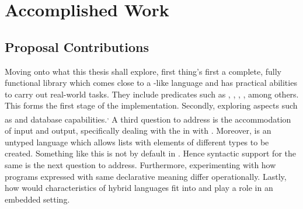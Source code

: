 \documentclass[thesis-solanki.tex]{subfiles}
\begin{document}
\chapter{Accomplished Work}\label{chap:accomplishedWork}

\section{Proposal Contributions}

Moving onto what this thesis shall explore, first thing's first a complete, fully functional library which comes
close to a -like language and has practical abilities to carry out real-world
tasks.
They include predicates such as 
, , , ,  among others.
This forms
the first stage of the implementation.
Secondly, exploring aspects such as  and database capabilities.\textsuperscript{,}
A third question to address is the accommodation of input and output, specifically dealing with the  in  with  .
Moreover,  is an untyped language which allows lists with elements of different types to be
created.
Something like this is not by default in .
Hence syntactic support for the same is the next question to address.
Furthermore, experimenting with how programs expressed with same declarative meaning differ
operationally. 
Lastly, how would characteristics of hybrid languages fit into and play a role in an embedded
setting. 
\end{document}

